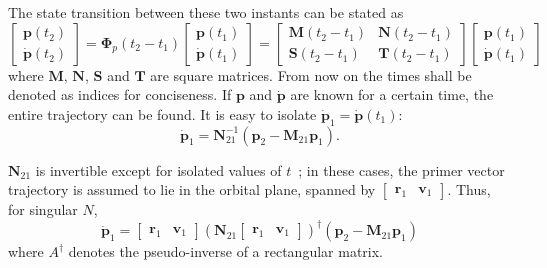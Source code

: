 The state transition between these two instants can be stated as
\begin{equation}
    \begin{bmatrix}
        \mathbf{p}(t_2) \\ \dot{\mathbf{p}}(t_2)
    \end{bmatrix} = \mathbf{\Phi}_p(t_2 - t_1) \begin{bmatrix}
        \mathbf{p}(t_1) \\ \dot{\mathbf{p}}(t_1)
    \end{bmatrix} = \begin{bmatrix}
        \mathbf{M}(t_2-t_1) & \mathbf{N}(t_2-t_1) \\ \mathbf{S}(t_2-t_1) & \mathbf{T}(t_2-t_1)
    \end{bmatrix} \begin{bmatrix}
        \mathbf{p}(t_1) \\ \dot{\mathbf{p}}(t_1)
    \end{bmatrix}
\end{equation}
where \(\mathbf{M}\), \(\mathbf{N}\), \(\mathbf{S}\) and \(\mathbf{T}\) are square matrices. From now on the times shall be denoted as indices for conciseness. If \(\mathbf{p}\) and \(\dot{\mathbf{p}}\) are known for a certain time, the entire trajectory can be found. It is easy to isolate \(\dot{\mathbf{p}}_1 = \dot{\mathbf{p}}(t_1)\):
\begin{equation}
    \dot{\mathbf{p}}_1 = \mathbf{N}^{-1}_{21} \left(\mathbf{p}_2 - \mathbf{M}_{21}\mathbf{p}_1\right).
\end{equation}

\(\mathbf{N}_{21}\) is invertible except for isolated values of \(t\)~\cite{Conway_2010}; in these cases, the primer vector trajectory is assumed to lie in the orbital plane, spanned by \(\begin{bmatrix}
    \mathbf{r}_1 & \mathbf{v}_1
\end{bmatrix}\). Thus, for singular \(N\),
\begin{equation}\label{eq:pdot1_singular}
    \dot{\mathbf{p}}_1 = \begin{bmatrix}
        \mathbf{r}_1 & \mathbf{v}_1
    \end{bmatrix} (\mathbf{N}_{21} \begin{bmatrix}
        \mathbf{r}_1 & \mathbf{v}_1
    \end{bmatrix})^\dagger \left(\mathbf{p}_2 - \mathbf{M}_{21}\mathbf{p}_1\right)
\end{equation}
where \(A^\dagger\) denotes the pseudo-inverse of a rectangular matrix.

